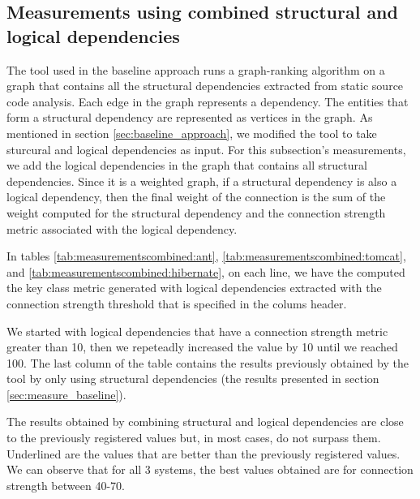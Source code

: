 \documentclass[runningheads]{comsis2}
\begin{document}
\subsection{Measurements using combined structural and logical dependencies}
\label{sec:measure_ld_sd}

The tool used in the baseline approach runs a graph-ranking algorithm on a graph that contains all the structural dependencies extracted from static source code analysis.
Each edge in the graph represents a dependency. The entities that form a structural dependency are represented as vertices in the graph. 
As mentioned in section \ref{sec:baseline_approach}, we modified the tool to take sturcural and logical dependencies as input.
For this subsection's measurements, we add the logical dependencies in the graph that contains all structural dependencies. Since it is a weighted graph, if a structural dependency is also a logical dependency, then the final weight of the connection is the sum of the weight computed for the structural dependency and the connection strength metric associated with the logical dependency.

In tables \ref{tab:measurementscombined:ant}, \ref{tab:measurementscombined:tomcat}, and \ref{tab:measurementscombined:hibernate}, on each line, we have the computed the key class metric generated with logical dependencies extracted with the connection strength threshold that is specified in the colums header.

We started with logical dependencies that have a connection strength metric greater than 10, then we repeteadly increased the value by 10 until we reached 100. The last column of the table contains the results previously obtained by the tool by only using structural dependencies (the results presented in section \ref{sec:measure_baseline}).


The results obtained by combining structural and logical dependencies are close to the previously registered values but, in most cases, do not surpass them. Underlined are the values that are better than the previously registered values. We can observe that for all 3 systems, the best values obtained are for connection strength between 40-70.
\end{document}
